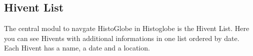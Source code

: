 \subsection{Hivent List}
The central modul to navgate HistoGlobe in Histoglobe is the Hivent List. 
Here you can see Hivents with additional informations in one list ordered by date.
Each Hivent has a name, a date and a location.